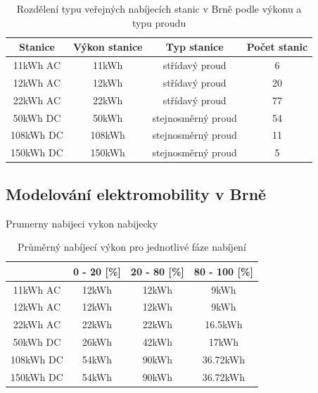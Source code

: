\documentclass[a4paper,11pt]{article}
\begin{document}
\begin{table}[h!]
    \centering
    \vspace{0.5cm} %
    \begin{tabular}{|c|c|c|c|}
        \hline
        \textbf{Stanice} & \textbf{Výkon stanice} & \textbf{Typ stanice} & \textbf{Počet stanic}\\
        \hline
        11kWh  AC &  11kWh   & střídavý proud       & 6  \\
        \hline
        12kWh  AC &  12kWh   & střídavý proud       & 20  \\
        \hline
        22kWh  AC &  22kWh   & střídavý proud       & 77  \\
        \hline
        50kWh  DC &  50kWh   & stejnosměrný proud   & 54  \\
        \hline
        108kWh DC &  108kWh  & stejnosměrný proud   & 11  \\
        \hline
        150kWh DC &  150kWh  & stejnosměrný proud   & 5  \\
        \hline
    \end{tabular}
    \caption{Rozdělení typu veřejných nabíjecích stanic v Brně podle výkonu a typu proudu}
    \label{table:charging-stations-distribution}
    \vspace{0.5cm} %
\end{table}


\subsection{Modelování elektromobility v Brně}


Prumerny nabijeci vykon nabijecky
\smallskip

\begin{table}[h!]
    \centering 
    \vspace{0.5cm} %
    \begin{tabular}{|c|c|c|c|}
        \hline
        \textbf{} & \textbf{0 - 20 [\%]} & \textbf{20 - 80 [\%]} & \textbf{80 - 100 [\%]}\\
        \hline
        11kWh AC  &  12kWh  & 12kWh & 9kWh     \\
        \hline
        12kWh AC  &  12kWh  & 12kWh & 9kWh     \\
        \hline
        22kWh AC  &  22kWh  & 22kWh & 16.5kWh  \\
        \hline
        50kWh DC  &  26kWh  & 42kWh & 17kWh    \\
        \hline
        108kWh DC &  54kWh  & 90kWh & 36.72kWh \\
        \hline
        150kWh DC &  54kWh  & 90kWh & 36.72kWh \\
        \hline
    \end{tabular}
    \caption{Průměrný nabíjecí výkon pro jednotlivé fáze nabíjení}
    \label{table:average-charging-power}
    \vspace{0.5cm} %
\end{table}
\end{document}
